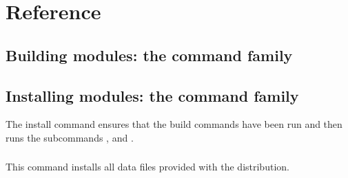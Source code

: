 \documentclass{howto}
\begin{document}



\section{Reference}
\label{reference}


\subsection{Building modules: the \protect{} command family}
\label{build-cmds}

\subsubsection{\protect{}}
\label{build-cmd}

\subsubsection{\protect{}}
\label{build-py-cmd}

\subsubsection{\protect{}}
\label{build-ext-cmd}

\subsubsection{\protect{}}
\label{build-clib-cmd}


\subsection{Installing modules: the \protect{} command family}
\label{install-cmd}

The install command ensures that the build commands have been run and then
runs the subcommands ,
 and
.

\subsubsection{\protect{}}
\label{install-lib-cmd}

\subsubsection{\protect{}}
\label{install-data-cmd}
This command installs all data files provided with the distribution.
\end{document}
